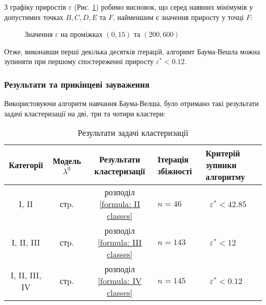 З графіку приростів $\varepsilon$ (Рис. \ref{figure: IV epsilon (0,15)-(200,600)}) робимо висновок, що серед наявних мінімумів у допустимих точках $B,C,D,E$ та $F$, найменшим є значення приросту у точці $F:$

\begin{figure}[H]
    \vspace{-0.7cm}
    \caption{Значення $\varepsilon$ на проміжках $(0,15)$ та $(200,600)$}
    \label{figure: IV epsilon (0,15)-(200,600)}
\end{figure}

Отже, виконавши перші декiлька десяткiв iтерацiй, алгоримт Баума-Вешла можна зупиняти при першому спостереженні приросту $\varepsilon^*<0.12$.

\subsubsection{Результати та прикінцеві зауваження}

Використовуючи алгоритм навчання Баума-Велша, було отримано такі результати задачі кластеризації на дві, три та чотири кластери:

\vspace{0.4cm}
\begin{table}[H]
    \begin{center}
        \begin{tabular}{||c|c|c|l|l||}
            \hline
            Категорії & 
            \parbox{2.29cm}{\centering Модель $\lambda^0$} & 
            \parbox{3.8cm}{\centering Результати кластеризації} & 
            \parbox{2.4cm}{\centering Ітерація збіжності} & 
            \parbox{2.8cm}{\vspace{0.3cm}\centering Критерій зупинки алгоритму \vspace{0.2cm}} \\
            \hline
            I, II 
                & стp. \pageref{section: II classes} 
                & розподіл \ref{formula: II classes}
                & \quad $n=46$
                & \ $\varepsilon^*<42.85$ \\
            I, II, III 
                & стp. \pageref{section: III classes} 
                & розподіл \ref{formula: III classes} 
                & \quad $n=143$
                & \ $\varepsilon^*<12$ \\
            I, II, III, IV 
                & стp. \pageref{section: IV classes} 
                & розподіл \ref{formula: IV classes} 
                & \quad $n=145$
                & \ $\varepsilon^*<0.12$ \\
            \hline
        \end{tabular}
    \end{center}
    \caption{Результати задачі кластеризації}
    \label{table: results}
\end{table}

